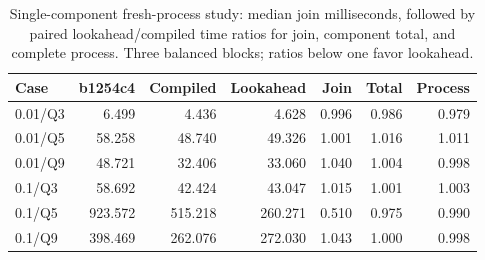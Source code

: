 \begin{table}[ht]
\caption{Single-component fresh-process study: median join milliseconds, followed by paired lookahead/compiled time ratios for join, component total, and complete process. Three balanced blocks; ratios below one favor lookahead.}
\label{tab:lookahead}
\centering\small
\begin{tabular}{@{}lrrrrrr@{}}
\toprule
Case & b1254c4 & Compiled & Lookahead & Join & Total & Process \\
\midrule
0.01/Q3 & 6.499 & 4.436 & 4.628 & 0.996 & 0.986 & 0.979 \\
0.01/Q5 & 58.258 & 48.740 & 49.326 & 1.001 & 1.016 & 1.011 \\
0.01/Q9 & 48.721 & 32.406 & 33.060 & 1.040 & 1.004 & 0.998 \\
0.1/Q3 & 58.692 & 42.424 & 43.047 & 1.015 & 1.001 & 1.003 \\
0.1/Q5 & 923.572 & 515.218 & 260.271 & 0.510 & 0.975 & 0.990 \\
0.1/Q9 & 398.469 & 262.076 & 272.030 & 1.043 & 1.000 & 0.998 \\
\bottomrule
\end{tabular}
\end{table}
